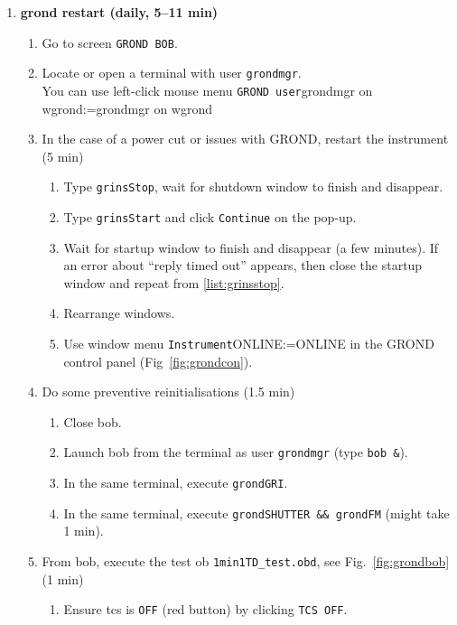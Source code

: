 \documentclass[11pt,fleqn]{book} %
\makeatletter
\def\menu#1#2{\texttt{#1}\ifx{}#2\else\@for\@x:=#2\do{$\rightarrow$\texttt{\@x}}\fi}
\def\wmenu#1#2{window menu \menu{#1}{#2}}
\def\mmenu#1#2{left-click mouse menu \menu{#1}{#2}}
\makeatother
\begin{document}
\begin{enumerate}
  \item \textbf{\gls{grond} restart (daily, 5--11 min)}
        \label{list:grond}
        \begin{enumerate}
         \item Go to screen \texttt{GROND BOB}.
         \item Locate or open a terminal with user \texttt{grondmgr}.\\
               You can use \mmenu{GROND user}{grondmgr on wgrond}
         \item In the case of a power cut or issues with GROND, restart the instrument (5 min)
         \begin{enumerate}
           \item Type \texttt{grinsStop}, wait for shutdown window to finish and disappear.\label{list:grinsstop}
            \item Type \texttt{grinsStart} and click \texttt{Continue} on the pop-up.
            \item Wait for startup window to finish and disappear (a few minutes). If an error about ``reply timed out'' appears, then close the startup window and repeat from \ref{list:grinsstop}. \label{list:grinsstart}
            \item Rearrange windows.
            \item Use \wmenu{Instrument}{ONLINE} in the GROND control panel (Fig~\ref{fig:grondcon}).\label{list:grondonline}
         \end{enumerate}
         \item Do some preventive reinitialisations (1.5 min)\label{list:grond-prophylaxis}
           \begin{enumerate}
             \item Close \gls{bob}.
             \item Launch \gls{bob} from the terminal as user \texttt{grondmgr} (type \texttt{bob \&}).
             \item In the same terminal, execute \texttt{grondGRI}.
             \item In the same terminal, execute \texttt{grondSHUTTER \&\& grondFM} (might take 1 min).
           \end{enumerate}
         \item From \gls{bob}, execute the test \gls{ob} \texttt{1min1TD\_test.obd}, see Fig.~\ref{fig:grondbob} (1 min)
           \begin{enumerate}
             \item Ensure \gls{tcs} is \texttt{OFF} (red button) by clicking \texttt{TCS OFF}.

\end{enumerate}
\end{enumerate}
\end{enumerate}
\end{document}
